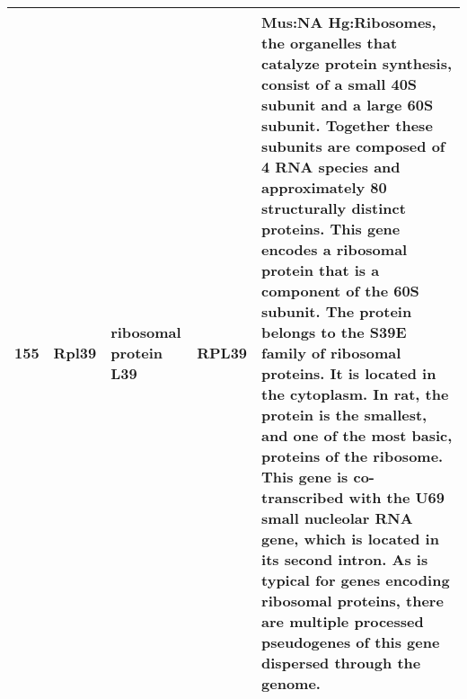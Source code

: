 \documentclass[11pt, landscape]{article}   	%
\begin{document}
\begin{table}[ht]
\begin{tabular}{rlp{3cm}lp{12cm}}
  155 & Rpl39 & ribosomal protein L39 & RPL39 & Mus:NA Hg:Ribosomes, the organelles that catalyze protein synthesis, consist of a small 40S subunit and a large 60S subunit. Together these subunits are composed of 4 RNA species and approximately 80 structurally distinct proteins. This gene encodes a ribosomal protein that is a component of the 60S subunit. The protein belongs to the S39E family of ribosomal proteins. It is located in the cytoplasm. In rat, the protein is the smallest, and one of the most basic, proteins of the ribosome. This gene is co-transcribed with the U69 small nucleolar RNA gene, which is located in its second intron. As is typical for genes encoding ribosomal proteins, there are multiple processed pseudogenes of this gene dispersed through the genome. \\ 

   \hline
\end{tabular}
\end{table}
\end{document}
